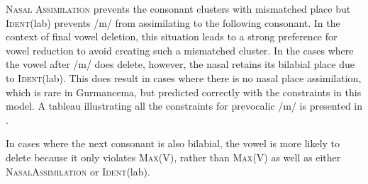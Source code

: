 \documentclass[output=paper,newtxmath,modfonts,nonflat,draftmode]{langsci/langscibook}
\begin{document}
\textsc{Nasal Assimilation} prevents the consonant clusters with mismatched place but \textsc{Ident}(lab) prevents /m/ from assimilating to the following consonant. In the context of final vowel deletion, this situation leads to a strong preference for vowel reduction to avoid creating such a mismatched cluster.  In the cases where the vowel after /m/ does delete, however, the nasal retains its bilabial place due to \textsc{Ident}(lab). This does result in cases where there is no nasal place assimilation, which is rare in Gurmancema, but predicted correctly with the constraints in this model. 
A tableau illustrating all the constraints for prevocalic /m/ is presented in . 


\begin{table}
\caption{Tableau for /mi\#C/ with sample phrase ‘elephants eat’, $n=44$}
\label{tab:baird:8}
\footnotesize
{}
\end{table}

In cases where the next consonant is also bilabial, the vowel is more likely to delete because it only violates \textsc{Max}(V), rather than \textsc{Max}(V) as well as either \textsc{NasalAssimilation} or \textsc{Ident}(lab). 
\end{document}

